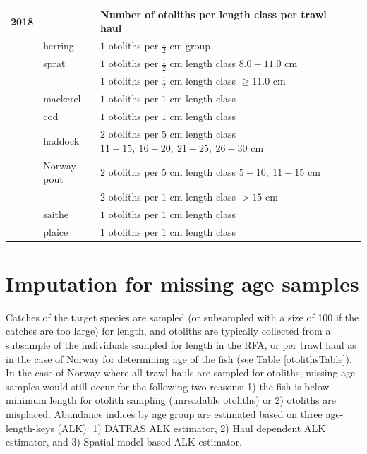 \documentclass[a4paper 12pt]{article}
\numberwithin{equation}{section}
\begin{document}
\begin{appendices}
\begin{small}
\begin{table}[h!]
\begin{tabularx}{\linewidth}{r l l l l X}
{\bf 2018} & & {\bf Number of otoliths per length class per trawl haul}  \\[1.8ex]
  & herring  &  $1$  otoliths per $\frac{1}{2}$ cm group \\[0.8ex]
     & sprat    & $1$  otoliths per $\frac{1}{2}$ cm length class  $8.0 -11.0$ cm\\[0.8ex]
              & & $1$  otoliths per $\frac{1}{2}$ cm length class  $\geq 11.0$ cm\\[0.8ex]
& mackerel      & $1$  otoliths per $1$ cm length class \\[0.8ex]
& cod       	  & $1$  otoliths per $1$ cm length class\\[0.8ex]
& haddock & $2$  otoliths per $5$ cm length class $11 -15, \ 16-20, \ 21-25, \ 26-30$ cm \\[0.8ex]
& Norway pout & $2$  otoliths per $5$ cm length class $5 -10, \ 11-15$ cm\\[0.8ex]
               & & $2$  otoliths per $1$ cm length class $> 15$ cm\\[1.8ex]
&saithe        & $1$  otoliths per $1$ cm length class \\[0.8ex]  
&plaice       & $1$  otoliths per $1$ cm length class \\[0.5ex]
\bottomrule         
\end{tabularx}
\end{table}
\end{small}


\section{\large Imputation for missing age samples}
\label{sec:imputationappendix}
Catches of the target species are sampled (or subsampled with a size of 100 if the catches are too large) for length, and otoliths are typically collected from a subsample of the individuals sampled for length in the RFA,  or per trawl haul as in the case of Norway for determining age of the fish (see Table \ref{otolithsTable}). In the case of Norway where all trawl hauls are sampled for otoliths, missing age samples would still occur for the following two reasons: 1) the fish is below minimum length for otolith sampling (unreadable otoliths) or 2) otoliths are misplaced. Abundance indices by age group are estimated based on three age-length-keys (ALK): 1) DATRAS ALK estimator, 2) Haul dependent ALK estimator, and 3) Spatial model-based ALK estimator.

\end{appendices}
\end{document}
